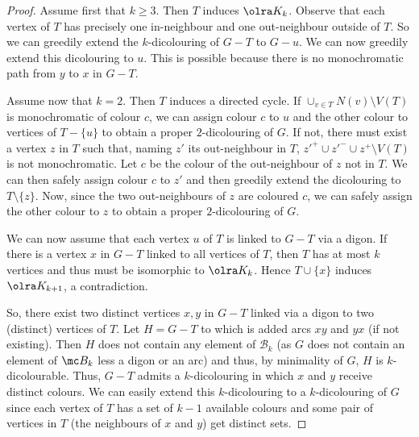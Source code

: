 \begin{proof}
Assume first that $k \geq 3$. Then $T$ induces $\olra K_{k}$. 
Observe that each vertex of $T$ has precisely one in-neighbour and one out-neighbour outside of $T$. So we can greedily extend the $k$-dicolouring of $G-T$ to $G-u$. We can now greedily extend this dicolouring to $u$. This is possible because there is no monochromatic path from $y$ to $x$ in $G-T$. 


Assume now that $k=2$. Then $T$ induces a directed cycle. 
If $\cup_{v \in T} N(v) \setminus V(T)$  is monochromatic of colour $c$, we can assign colour $c$ to $u$ and the other colour to vertices of $T-\{u\}$ to obtain a proper $2$-dicolouring of $G$. If not,  there must exist a vertex $z$ in $T$ such that, naming $z'$ its out-neighbour in $T$, $z'^{+} \cup z'^{-} \cup z^{+} \setminus V(T)$ is not monochromatic. Let $c$ be the colour of the out-neighbour of $z$ not in $T$. We can then safely assign colour $c$ to $z'$ and then greedily extend the dicolouring to $T \setminus \{z\}$.  Now, since the two out-neighbours of $z$ are coloured $c$, we can safely assign the other colour to $z$ to obtain a proper $2$-dicolouring of $G$. 
\medskip


We can now assume that each vertex $u$ of $T$ is linked to $G - T$ via a digon. 
If there is a vertex $x$ in $G-T$ linked to all vertices of $T$, then $T$ has at most $k$ vertices and thus must be isomorphic to $\olra K_{k}$. Hence $T \cup \{x\}$ induces $\olra K_{k+1}$, a contradiction. 

So, there exist two distinct vertices $x,y$ in $G-T$ linked via a digon to two (distinct) vertices of $T$. 
Let $H = G - T$ to which is added arcs $xy$ and $yx$ (if not existing). Then $H$ does not contain any element of $\mathcal B_{k}$ (as $G$ does not contain an element of $\mc B_{k}$ less a digon or an arc) and thus, by minimality of $G$, $H$ is $k$-dicolourable. 
Thus, $G - T$ admits a $k$-dicolouring in which $x$ and $y$ receive distinct colours. We can easily extend this $k$-dicolouring to a $k$-dicolouring of $G$ since each vertex of $T$ has a set of $k-1$ available colours and some pair  of vertices  in $T$ (the neighbours of $x$ and $y$) get distinct sets.
\end{proof}

